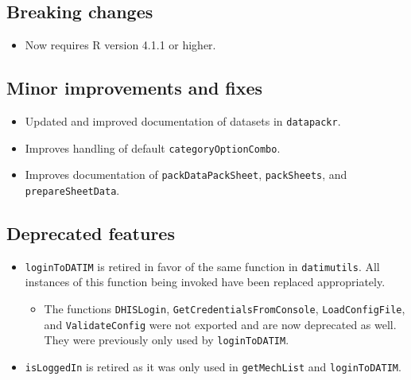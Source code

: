 \documentclass[
  openany]{book}
\providecommand{\tightlist}{%
  \setlength{\itemsep}{0pt}\setlength{\parskip}{0pt}}
\begin{document}
\hypertarget{breaking-changes}{%
\subsection{Breaking changes}\label{breaking-changes}}

\begin{itemize}
\tightlist
\item
  Now requires R version 4.1.1 or higher.
\end{itemize}

\hypertarget{minor-improvements-and-fixes}{%
\subsection{Minor improvements and fixes}\label{minor-improvements-and-fixes}}

\begin{itemize}
\tightlist
\item
  Updated and improved documentation of datasets in \texttt{datapackr}.
\item
  Improves handling of default \texttt{categoryOptionCombo}.
\item
  Improves documentation of \texttt{packDataPackSheet}, \texttt{packSheets}, and \texttt{prepareSheetData}.
\end{itemize}

\hypertarget{deprecated-features}{%
\subsection{Deprecated features}\label{deprecated-features}}

\begin{itemize}
\tightlist
\item
  \texttt{loginToDATIM} is retired in favor of the same function in \texttt{datimutils}. All
  instances of this function being invoked have been replaced appropriately.

  \begin{itemize}
  \tightlist
  \item
    The functions \texttt{DHISLogin}, \texttt{GetCredentialsFromConsole}, \texttt{LoadConfigFile},
    and \texttt{ValidateConfig} were not exported and are now deprecated as well.
    They were previously only used by \texttt{loginToDATIM}.
  \end{itemize}
\item
  \texttt{isLoggedIn} is retired as it was only used in \texttt{getMechList} and
  \texttt{loginToDATIM}.
\end{itemize}
\end{document}
